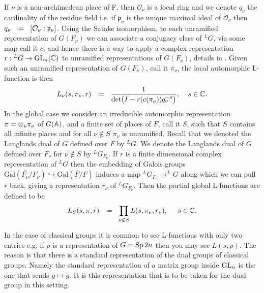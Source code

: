 If \(\nu\) is a non-archimedean place of F, then \(\mathcal{O}_\nu\) is a local ring and we denote \(q_\nu\) the cardinality of the residue field i.e. if \(\mathfrak{p}_\nu\) is the unique maximal ideal of \(\mathcal{O}_\nu\) then \(q_\nu \defeq [\mathcal{O}_\nu: \mathfrak{p}_\nu]\). Using the Satake isomorphism, to each unramified representation of \(G(F_\nu)\) we can associate a conjugacy class of \(^LG\), via some map call it \(c\), and hence there is a way to apply a complex representation \(r: \phantom{ }^LG \to \GL_n(\C)\) to unramified representations of \(G(F_\nu)\), details in \cite[2]{shahidiEisensteinSeriesAutomorphic2010}. 
Given such an unramified representation of \(G(F_\nu)\), call it \(\pi_\nu\), the local automorphic L-function is then 
\[ L_\nu(s,\pi_\nu , r ) \defeq  \frac{1}{\det\bigl( I - r(c(\pi_\nu))q_\nu^{-s} \bigr)} ,\;\;\;\; s\in \C.\]
In the global case we consider an irreducible automorphic representation \(\pi = \otimes_\nu \pi_\nu\) of \(G(\A)\), and a finite set of places of \(F\), call it \(S\), such that \(S\) contains all infinite places and for all \(\nu\notin S\) \(\pi_\nu\) is unramified. Recall that we denoted the Langlands dual of \(G\) defined over \(F\) by \(^LG\). We denote the Langlands dual of \(G\) defined over \(F_\nu\) for \(\nu\notin S\) by \(^LG_{F_\nu}\).  If \(r\) is a finite dimensional complex representation of \(^LG\) then the embedding of Galois groups \(\mathrm{Gal}(\bar{F_\nu} / F_\nu) \hookrightarrow \mathrm{Gal}(\bar{F} / F) \) induces a map \(^LG_{F_\nu} \to ^LG\) along which we can pull \(r\) back, giving a representation \(r_\nu\) of \(^LG_{F_\nu}\). Then the partial global L-functions are defined to be 
\[L_S(s, \pi, r) \defeq \prod_{\nu\notin S} L(s, \pi_\nu, r_\nu), \;\;\;\;\; s\in \C.\]


\begin{example}
	In the case of classical groups it is common to see L-functions with only two entries e.g. if \(\rho\) is a representation of \(G = \operatorname{Sp}{2n}\) then you may see 
	\(L(s, \rho).\)
	The reason is that there is a standard representation of the dual groups of classical groups. Namely the standard representation of a matrix group inside \(\operatorname{GL}_n\) is the one that sends \(g\mapsto g\). It is this representation that is to be taken for the dual group in this setting.
\end{example}

